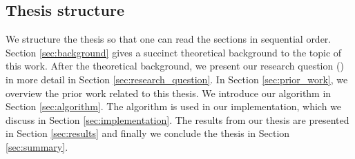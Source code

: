 \subsection{Thesis structure}
We structure the thesis so that one can read the sections in sequential order.
Section \ref{sec:background} gives a succinct theoretical background to the topic of this work.
After the theoretical background, we present our research question () in more detail in Section \ref{sec:research_question}.
In Section \ref{sec:prior_work}, we overview the prior work related to this thesis.
We introduce our algorithm in Section \ref{sec:algorithm}.
The algorithm is used in our implementation, which we discuss in Section \ref{sec:implementation}.
The results from our thesis are presented in Section \ref{sec:results} and finally we conclude the thesis in Section \ref{sec:summary}.
